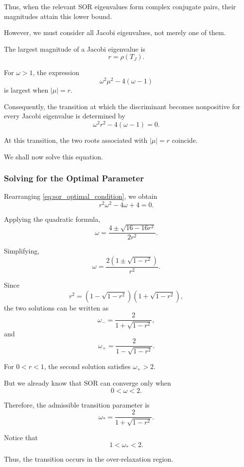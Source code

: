 \documentclass[11pt,a4paper]{article}
\theoremstyle{definition}
\theoremstyle{remark}
\begin{document}
Thus, when the relevant SOR eigenvalues
form complex conjugate pairs, their
magnitudes attain this lower bound.

However, we must consider all Jacobi
eigenvalues, not merely one of them.

The largest magnitude of a Jacobi
eigenvalue is
\[
    r=\rho(T_J).
\]

For $\omega>1$, the expression
\[
    \omega^2\mu^2-4(\omega-1)
\]
is largest when $|\mu|=r$.

Consequently, the transition at which
the discriminant becomes nonpositive
for every Jacobi eigenvalue is determined by
\begin{equation}
    \boxed{
    \omega^2r^2-4(\omega-1)=0.
    }
    \label{eq:sor_optimal_condition}
\end{equation}

At this transition, the two roots
associated with $|\mu|=r$ coincide.

We shall now solve this equation.


\subsubsection*{Solving for the Optimal Parameter}

Rearranging
\eqref{eq:sor_optimal_condition},
we obtain
\[
    r^2\omega^2-4\omega+4=0.
\]

Applying the quadratic formula,
\[
    \omega
    =
    \frac{
        4\pm\sqrt{16-16r^2}
    }{2r^2}.
\]

Simplifying,
\[
    \omega
    =
    \frac{
        2\left(1\pm\sqrt{1-r^2}\right)
    }{r^2}.
\]

Since
\[
    r^2=
    \left(1-\sqrt{1-r^2}\right)
    \left(1+\sqrt{1-r^2}\right),
\]
the two solutions can be written as
\[
    \omega_-
    =
    \frac{2}{1+\sqrt{1-r^2}},
\]
and
\[
    \omega_+
    =
    \frac{2}{1-\sqrt{1-r^2}}.
\]

For $0<r<1$, the second solution
satisfies $\omega_+>2$.

But we already know that SOR can converge
only when
\[
    0<\omega<2.
\]

Therefore, the admissible transition
parameter is
\begin{equation}
\boxed{
    \omega_*
    =
    \frac{2}{1+\sqrt{1-r^2}}.
}
\label{eq:sor_transition_parameter}
\end{equation}

Notice that
\[
    1<\omega_*<2.
\]

Thus, the transition occurs in the
over-relaxation region.
\end{document}
